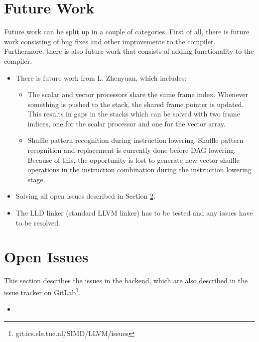 \section{Future Work}\label{sec:future_work}
Future work can be split up in a couple of categories. First of all, there is future work consisting of bug fixes and other improvements to the compiler. Furthermore, there is also future work that consists of adding functionality to the compiler.
%
\begin{itemize}
    \item There is future work from L. Zhenyuan, which includes:
    \begin{itemize}
        \item The scalar and vector processors share the same frame index. Whenever something is pushed to the stack, the shared frame pointer is updated. This results in gaps in the stacks which can be solved with two frame indices, one for the scalar processor and one for the vector array.
        \item Shuffle pattern recognition during instruction lowering. Shuffle pattern recognition and replacement is currently done before DAG lowering. Because of this, the opportunity is lost to generate new vector shuffle operations in the instruction combination during the instruction lowering stage.
    \end{itemize}
    \item Solving all open issues described in Section \ref{sec:issues}.
    \item The LLD linker (standard LLVM linker) has to be tested and any issues have to be resolved.
\end{itemize}

\section{Open Issues}\label{sec:issues}
This section describes the issues in the backend, which are also described in the issue tracker on GitLab\footnote{git.ics.ele.tue.nl/SIMD/LLVM/issues}.

\begin{itemize}
\item[]
\end{itemize}

